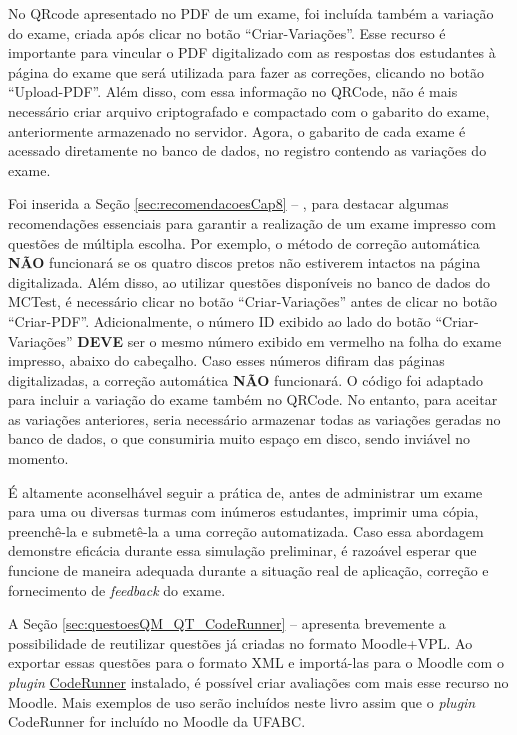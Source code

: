No QRcode apresentado no PDF de um exame, foi incluída também a variação do exame, criada após clicar no botão ``Criar-Variações''. Esse recurso é importante para vincular o PDF digitalizado com as respostas dos estudantes à página do exame que será utilizada para fazer as correções, clicando no botão ``Upload-PDF''. Além disso, com essa informação no QRCode, não é mais necessário criar arquivo criptografado e compactado com o gabarito do exame, anteriormente armazenado no servidor. Agora, o gabarito de cada exame é acessado diretamente no banco de dados, no registro contendo as variações do exame.

Foi inserida a Seção \ref{sec:recomendacoesCap8} -- , para destacar algumas recomendações essenciais para garantir a realização de um exame impresso com questões de múltipla escolha. Por exemplo, o método de correção automática \textbf{NÃO} funcionará se os quatro discos pretos não estiverem intactos na página digitalizada. Além disso, ao utilizar questões disponíveis no banco de dados do MCTest, é necessário clicar no botão ``Criar-Variações'' antes de clicar no botão ``Criar-PDF''. Adicionalmente, o número ID exibido ao lado do botão ``Criar-Variações'' \textbf{DEVE} ser o mesmo número exibido em vermelho na folha do exame impresso, abaixo do cabeçalho. Caso esses números difiram das páginas digitalizadas, a correção automática \textbf{NÃO} funcionará. O código foi adaptado para incluir a variação do exame também no QRCode. No entanto, para aceitar as variações anteriores, seria necessário armazenar todas as variações geradas no banco de dados, o que consumiria muito espaço em disco, sendo inviável no momento.

É altamente aconselhável seguir a prática de, antes de administrar um exame para uma ou diversas turmas com inúmeros estudantes, imprimir uma cópia, preenchê-la e submetê-la a uma correção automatizada. Caso essa abordagem demonstre eficácia durante essa simulação preliminar, é razoável esperar que funcione de maneira adequada durante a situação real de aplicação, correção e fornecimento de \textit{feedback} do exame.
 
A Seção \ref{sec:questoesQM_QT_CodeRunner} –  apresenta brevemente a possibilidade de reutilizar questões já criadas no formato Moodle+VPL. Ao exportar essas questões para o formato XML e importá-las para o Moodle com o \textit{plugin} \href{https://moodle.org/plugins/qtype_coderunner}{CodeRunner} instalado, é possível criar avaliações com mais esse recurso no Moodle. Mais exemplos de uso serão incluídos neste livro assim que o \textit{plugin} CodeRunner for incluído no Moodle da UFABC.

